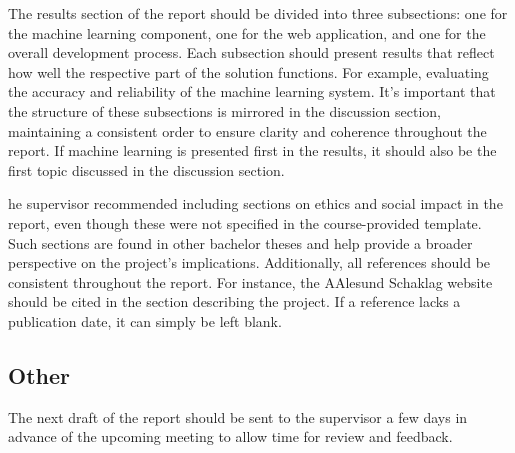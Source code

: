The results section of the report should be divided into three subsections: one for the machine learning component, one for the web application, and one for the overall development process. Each subsection should present results that reflect how well the respective part of the solution functions. For example, evaluating the accuracy and reliability of the machine learning system. It’s important that the structure of these subsections is mirrored in the discussion section, maintaining a consistent order to ensure clarity and coherence throughout the report. If machine learning is presented first in the results, it should also be the first topic discussed in the discussion section.

he supervisor recommended including sections on ethics and social impact in the report, even though these were not specified in the course-provided template. Such sections are found in other bachelor theses and help provide a broader perspective on the project's implications. Additionally, all references should be consistent throughout the report. For instance, the AAlesund Schaklag website should be cited in the section describing the project. If a reference lacks a publication date, it can simply be left blank.

\subsection{Other}
The next draft of the report should be sent to the supervisor a few days in advance of the upcoming meeting to allow time for review and feedback.